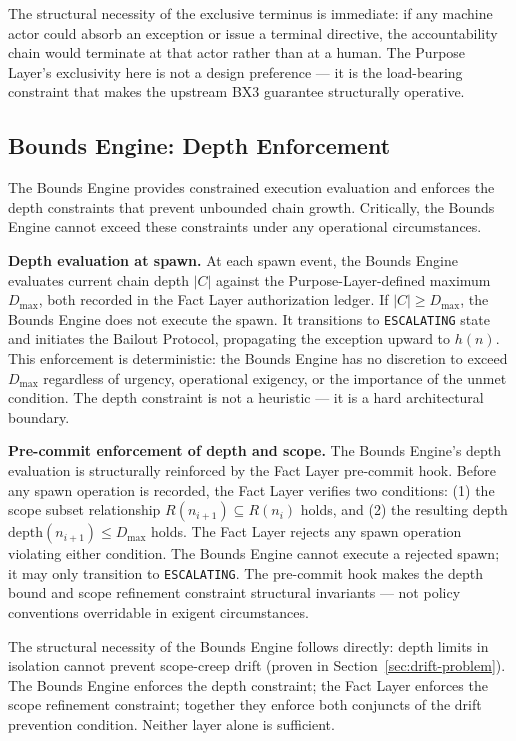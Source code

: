 The structural necessity of the exclusive terminus is immediate: if any machine actor could absorb an exception or issue a terminal directive, the accountability chain would terminate at that actor rather than at a human. The Purpose Layer's exclusivity here is not a design preference --- it is the load-bearing constraint that makes the upstream BX3 guarantee structurally operative.

\subsection{Bounds Engine: Depth Enforcement}
\label{sec:rs-bounds-engine}

The Bounds Engine provides constrained execution evaluation and enforces the depth constraints that prevent unbounded chain growth. Critically, the Bounds Engine cannot exceed these constraints under any operational circumstances.

\medskip
\noindent\textbf{Depth evaluation at spawn.} At each spawn event, the Bounds Engine evaluates current chain depth $|C|$ against the Purpose-Layer-defined maximum $D_{\mathrm{max}}$, both recorded in the Fact Layer authorization ledger. If $|C| \geq D_{\mathrm{max}}$, the Bounds Engine does not execute the spawn. It transitions to \texttt{ESCALATING} state and initiates the Bailout Protocol, propagating the exception upward to $h(n)$. This enforcement is deterministic: the Bounds Engine has no discretion to exceed $D_{\mathrm{max}}$ regardless of urgency, operational exigency, or the importance of the unmet condition. The depth constraint is not a heuristic --- it is a hard architectural boundary.

\medskip
\noindent\textbf{Pre-commit enforcement of depth and scope.} The Bounds Engine's depth evaluation is structurally reinforced by the Fact Layer pre-commit hook. Before any spawn operation is recorded, the Fact Layer verifies two conditions: (1) the scope subset relationship $R(n_{i+1}) \subseteq R(n_i)$ holds, and (2) the resulting depth $\mathrm{depth}(n_{i+1}) \leq D_{\mathrm{max}}$ holds. The Fact Layer rejects any spawn operation violating either condition. The Bounds Engine cannot execute a rejected spawn; it may only transition to \texttt{ESCALATING}. The pre-commit hook makes the depth bound and scope refinement constraint structural invariants --- not policy conventions overridable in exigent circumstances.

The structural necessity of the Bounds Engine follows directly: depth limits in isolation cannot prevent scope-creep drift (proven in Section~\ref{sec:drift-problem}). The Bounds Engine enforces the depth constraint; the Fact Layer enforces the scope refinement constraint; together they enforce both conjuncts of the drift prevention condition. Neither layer alone is sufficient.

